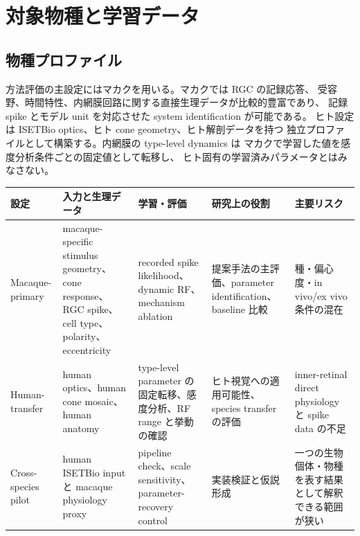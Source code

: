 \documentclass[a4paper,10pt,twocolumn,uplatex,dvipdfmx]{jsarticle}
\begin{document}
\clearpage

\section{対象物種と学習データ}

\subsection{物種プロファイル}

方法評価の主設定にはマカクを用いる。マカクでは RGC の記録応答、
受容野、時間特性、内網膜回路に関する直接生理データが比較的豊富であり、
記録 spike とモデル unit を対応させた system identification が可能である。
ヒト設定は ISETBio optics、ヒト cone geometry、ヒト解剖データを持つ
独立プロファイルとして構築する。内網膜の type-level dynamics は
マカクで学習した値を感度分析条件ごとの固定値として転移し、
ヒト固有の学習済みパラメータとはみなさない。

\begin{center}
\centering
{}
\label{tab:species-policy}
\small
\setlength{\tabcolsep}{4pt}
\begin{tabularx}{0.98\textwidth}{
  >{\raggedright\arraybackslash}p{}
  >{\raggedright\arraybackslash}p{}
  >{\raggedright\arraybackslash}p{}
  >{\raggedright\arraybackslash}p{}
  Y}
\toprule
\textbf{設定} &
\textbf{入力と生理データ} &
\textbf{学習・評価} &
\textbf{研究上の役割} &
\textbf{主要リスク} \\
\midrule
Macaque-primary &
macaque-specific stimulus geometry、cone response、RGC spike、
cell type、polarity、eccentricity &
recorded spike likelihood、dynamic RF、mechanism ablation &
提案手法の主評価、parameter identification、baseline 比較 &
種・偏心度・in vivo/ex vivo 条件の混在 \\

Human-transfer &
human optics、human cone mosaic、human anatomy &
type-level parameter の固定転移、感度分析、RF range と挙動の確認 &
ヒト視覚への適用可能性、species transfer の評価 &
inner-retinal direct physiology と spike data の不足 \\

Cross-species pilot &
human ISETBio input と macaque physiology proxy &
pipeline check、scale sensitivity、parameter-recovery control &
実装検証と仮説形成 &
一つの生物個体・物種を表す結果として解釈できる範囲が狭い \\
\bottomrule
\end{tabularx}
\end{center}
\end{document}
